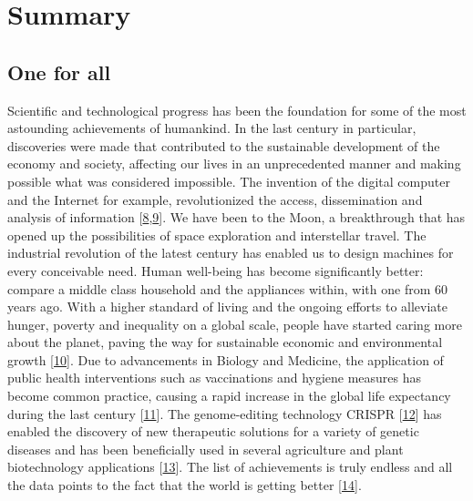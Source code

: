 \documentclass[
  12pt,
]{book}
\begin{document}
\mainmatter

\hypertarget{summary}{%
\chapter*{Summary}\label{summary}}

\hypertarget{one-for-all}{%
\section*{One for all}\label{one-for-all}}

\indent

Scientific and technological progress has been the foundation for some of the most astounding achievements of humankind.
In the last century in particular, discoveries were made that contributed to the sustainable development of the economy and society, affecting our lives in an unprecedented manner and making possible what was considered impossible.
The invention of the digital computer and the Internet for example, revolutionized the access, dissemination and analysis of information {[}\protect\hyperlink{ref-Abbate2000}{8},\protect\hyperlink{ref-Naughton2016}{9}{]}.
We have been to the Moon, a breakthrough that has opened up the possibilities of space exploration and interstellar travel.
The industrial revolution of the latest century has enabled us to design machines for every conceivable need.
Human well-being has become significantly better: compare a middle class household and the appliances within, with one from 60 years ago.
With a higher standard of living and the ongoing efforts to alleviate hunger, poverty and inequality on a global scale, people have started caring more about the planet, paving the way for sustainable economic and environmental growth {[}\protect\hyperlink{ref-Polasky2019}{10}{]}.
Due to advancements in Biology and Medicine, the application of public health interventions such as vaccinations and hygiene measures has become common practice, causing a rapid increase in the global life expectancy during the last century {[}\protect\hyperlink{ref-Roser2013}{11}{]}.
The genome-editing technology CRISPR {[}\protect\hyperlink{ref-Jinek2012}{12}{]} has enabled the discovery of new therapeutic solutions for a variety of genetic diseases and has been beneficially used in several agriculture and plant biotechnology applications {[}\protect\hyperlink{ref-Zhu2020}{13}{]}.
The list of achievements is truly endless and all the data points to the fact that the world is getting better {[}\protect\hyperlink{ref-Bailey2020}{14}{]}.
\end{document}

